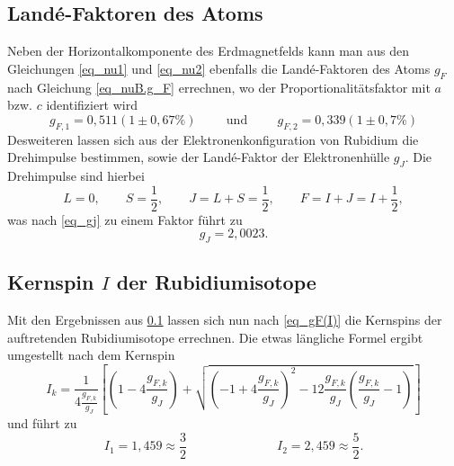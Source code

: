 \subsection{Landé-Faktoren des Atoms}
\label{sec_lande}
Neben der Horizontalkomponente des Erdmagnetfelds kann man aus den Gleichungen \eqref{eq_nu1} und \eqref{eq_nu2} ebenfalls die Landé-Faktoren des
Atoms $g_F$ nach Gleichung \eqref{eq_nuB.g_F} errechnen, wo der Proportionalitätsfaktor mit $a$ bzw. $c$ identifiziert wird
\begin{equation}
 g_{F,1} = 0,511(1 \pm 0,67\%) \hspace{1cm}\text{und}\hspace{1cm}g_{F,2} = 0,339(1\pm 0,7\%) 
\end{equation}
Desweiteren lassen sich aus der Elektronenkonfiguration von Rubidium \cite{EKonf} die Drehimpulse bestimmen, sowie der Landé-Faktor der Elektronenhülle $g_J$.
Die Drehimpulse sind hierbei
\begin{equation}
 L = 0 , \qquad S=\frac12 , \qquad J = L+S = \frac12, \qquad F = I+J= I + \frac12,
\end{equation}
was nach \eqref{eq_gj} zu einem Faktor führt zu
\begin{equation}
 g_J = 2,0023. 
\end{equation}

\subsection{Kernspin $I$ der Rubidiumisotope}
Mit den Ergebnissen aus \ref{sec_lande} lassen sich nun nach \eqref{eq_gF(I)} die Kernspins der auftretenden Rubidiumisotope errechnen. Die etwas
längliche Formel ergibt umgestellt nach dem Kernspin
\begin{equation}
 I_k = \frac{1}{4\frac{g_{F,k}}{g_J}} \left[\left(1-4\frac{g_{F,k}}{g_J}\right) + \sqrt{\left(-1+4\frac{g_{F,k}}{g_J}\right)^2-12\frac{g_{F,k}}{g_J}\left(\frac{g_{F,k}}{g_J}-1\right)}\right]
\end{equation}
und führt zu
\begin{equation}
 I_1 = 1,459 \approx \frac32 \hspace{3cm} I_2=	2,459 \approx \frac52.
\end{equation}

